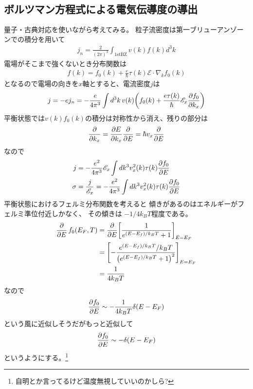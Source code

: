 \documentclass[11pt,dvipdfmx,a4paper]{jsarticle}
\begin{document}
\subsection{ボルツマン方程式による電気伝導度の導出}
量子・古典対応を使いながら考えてみる。
粒子流密度は第一ブリューアンゾーンでの積分を用いて
\begin{align}
    j_n = \frac{2}{(2\pi)^3}\int_{\text{1stBZ}} v(k)f(k) d^3k %
\end{align}
電場がそこまで強くないとき分布関数は
\begin{align}
    f(k) = f_0(k) + \frac{e}{\hbar}\tau(k)\mathscr{E}\cdot\nabla_kf_0(k)
\end{align}
となるので電場の向きを\(x\)軸とすると、電流密度\(j\)は
\begin{align}
    j = -ej_n = -\frac{e}{4\pi^3} \int d^3k\,v(k) \qty(f_0(k)
    +\frac{e\tau(k)}{\hbar}\mathscr{E}_x\pdv{f_0}{k_x}) %
\end{align}
平衡状態では\(v(k)f_0(k)\)の積分は対称性から消え、残りの部分は
\begin{align}
    \pdv{k_x} = \pdv{E}{k_x}\pdv{E} = \hbar v_x \pdv{E} %
\end{align}
なので
\begin{align}
    j &= -\frac{e^2}{4\pi^3}\mathscr{E}_x\int dk^3 v_x^2(k)\tau(k)\pdv{f_0}{E} \\%
    \sigma &= \frac{j}{\mathscr{E}_x} = -\frac{e^2}{4\pi^3}\int dk^3 v_x^2(k)\tau(k)\pdv{f_0}{E} %
\end{align}
平衡状態におけるフェルミ分布関数を考えると
傾きがあるのはエネルギーがフェルミ準位付近しかなく、
その傾きは \(-1/4k_BT\)程度である。
\begin{align}
    \pdv{E}\,f_0(E_F,T) &= \pdv{E}\qty[\frac{1}{e^{(E-E_f)/k_BT}+1}]_{E=E_F}\\
    &=\qty[-\frac{e^{(E-E_f)/k_BT}/k_BT}{\qty(e^{(E-E_f)/k_BT}+1)^2}]_{E=E_F}\\
    &=\frac{1}{4k_BT}
\end{align}
なので
\begin{align}
    \pdv{f_0}{E} \sim -\frac{1}{4k_BT}\delta(E-E_F)
\end{align}
という風に近似しそうだがもっと近似して
\begin{align}
    \pdv{f_0}{E} \sim -\delta(E-E_F) %
\end{align}
というようにする。\footnote{自明とか言ってるけど温度無視していいのかしら?}\\
\end{document}
